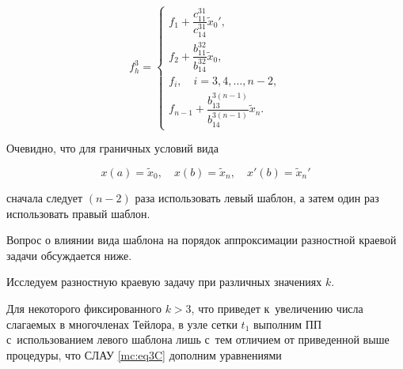 \begin{equation}

\label{mc:eq19}

   f_{h}^3=

\begin{cases}

f_{1}+\dfrac{c_{11}^{31}}{c_{14}^{31}} \widetilde{x}_0',

\\[3mm]

f_{2}+\dfrac{b_{11}^{32}}{b_{14}^{32}} \widetilde{x}_0,

\\[3mm]

f_{i},\quad  i=3,  4,  \dots,  n-2,

\\[1mm]

f_{n-1}+\dfrac{b_{13}^{3(n-1)}}{b_{14}^{3(n-1)}} \widetilde{x}_n.

\end{cases}

\end{equation}



Очевидно, что для граничных условий вида

\begin{equation}

\label{mc:eq20}

  x(a)=\widetilde{x}_0,\quad   x(b)=\widetilde{x}_n, \quad x'(b)=\widetilde{x}_n'

\end{equation}

сначала следует  $(n-2)$ раза  использовать левый шаблон, а затем один раз использовать  правый шаблон.



Вопрос о влиянии вида шаблона на порядок аппроксимации разностной краевой задачи обсуждается ниже.



\smallskip




Исследуем разностную краевую задачу  при различных значениях $k$.



Для некоторого фиксированного $k>3$, что приведет к~увеличению числа слагаемых в многочленах Тейлора, в узле сетки $    t_1$ выполним ПП с~использованием левого шаблона лишь с~тем отличием от приведенной выше процедуры, что СЛАУ \eqref{mc:eq3C} дополним уравнениями

